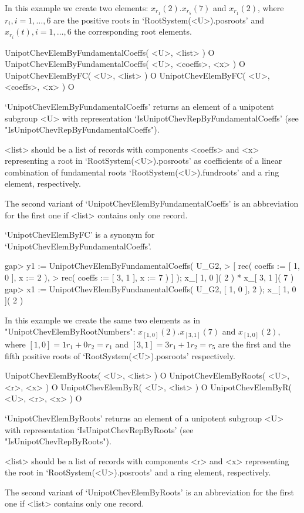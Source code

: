 In this example we create two elements: $x_{r_1}( 2 ) . x_{r_5}( 7 )$ and
$x_{r_1}( 2 )$, where $r_i, i = 1, \dots, 6$ are the positive roots in
`RootSystem(<U>).posroots' and $x_{r_i}(t), i = 1, \dots, 6$ the
corresponding root elements.

\>UnipotChevElemByFundamentalCoeffs( <U>, <list> ) O
\>UnipotChevElemByFundamentalCoeffs( <U>, <coeffs>, <x> ) O
\>UnipotChevElemByFC( <U>, <list> ) O
\>UnipotChevElemByFC( <U>, <coeffs>, <x> ) O

`UnipotChevElemByFundamentalCoeffs' returns an element of a unipotent
subgroup <U> with representation `IsUnipotChevRepByFundamentalCoeffs'
(see "IsUnipotChevRepByFundamentalCoeffs").

<list> should be a list of records with components <coeffs> and <x>
representing a root in `RootSystem(<U>).posroots' as coefficients of a
linear combination of fundamental roots `RootSystem(<U>).fundroots' and
a ring element, respectively.

The second variant of `UnipotChevElemByFundamentalCoeffs' is an
abbreviation for the first one if <list> contains only one record.

`UnipotChevElemByFC' is a synonym for `UnipotChevElemByFundamentalCoeffs'.

\beginexample
gap> y1 := UnipotChevElemByFundamentalCoeffs( U_G2,
>      [ rec( coeffs := [ 1, 0 ], x := 2 ),
>        rec( coeffs := [ 3, 1 ], x := 7 ) ] );
x_{[ 1, 0 ]}( 2 ) * x_{[ 3, 1 ]}( 7 )
gap> x1 := UnipotChevElemByFundamentalCoeffs( U_G2, [ 1, 0 ], 2 );
x_{[ 1, 0 ]}( 2 )
\endexample

In this example we create the same two elements as in
"UnipotChevElemByRootNumbers": 
$x_{[ 1, 0 ]}( 2 ) . x_{[ 3, 1 ]}( 7 )$ and $x_{[ 1, 0 ]}( 2 )$,
where $[ 1, 0 ] = 1r_1 + 0r_2 = r_1$ and $[ 3, 1 ] = 3r_1 + 1r_2=r_5$
are the first and the fifth positive roots of `RootSystem(<U>).posroots'
respectively.

\>UnipotChevElemByRoots( <U>, <list> ) O
\>UnipotChevElemByRoots( <U>, <r>, <x> ) O
\>UnipotChevElemByR( <U>, <list> ) O
\>UnipotChevElemByR( <U>, <r>, <x> ) O

`UnipotChevElemByRoots' returns an element of a unipotent subgroup <U>
with representation `IsUnipotChev\-RepByRoots'
(see "IsUnipotChevRepByRoots").

<list> should be a list of records with components <r> and <x>
representing the root in `RootSystem(<U>).posroots' and a ring
element, respectively.

The second variant of `UnipotChevElemByRoots' is an abbreviation for the
first one if <list> contains only one record.

